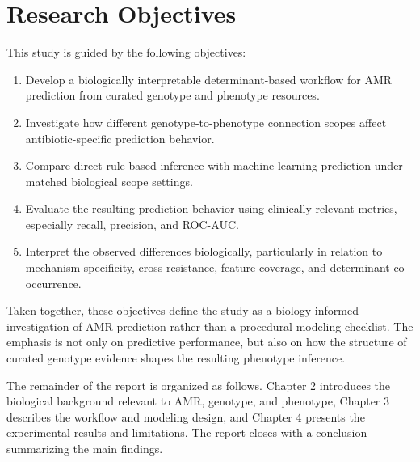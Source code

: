 \section{Research Objectives}

This study is guided by the following objectives:

\begin{enumerate}[label=\arabic*.]
    \item Develop a biologically interpretable determinant-based workflow for AMR prediction from curated genotype and phenotype resources.
    \item Investigate how different genotype-to-phenotype connection scopes affect antibiotic-specific prediction behavior.
    \item Compare direct rule-based inference with machine-learning prediction under matched biological scope settings.
    \item Evaluate the resulting prediction behavior using clinically relevant metrics, especially recall, precision, and ROC-AUC.
    \item Interpret the observed differences biologically, particularly in relation to mechanism specificity, cross-resistance, feature coverage, and determinant co-occurrence.
\end{enumerate}

Taken together, these objectives define the study as a biology-informed investigation of AMR prediction rather than a procedural modeling checklist. The emphasis is not only on predictive performance, but also on how the structure of curated genotype evidence shapes the resulting phenotype inference.

The remainder of the report is organized as follows. Chapter 2 introduces the biological background relevant to AMR, genotype, and phenotype, Chapter 3 describes the workflow and modeling design, and Chapter 4 presents the experimental results and limitations. The report closes with a conclusion summarizing the main findings.
